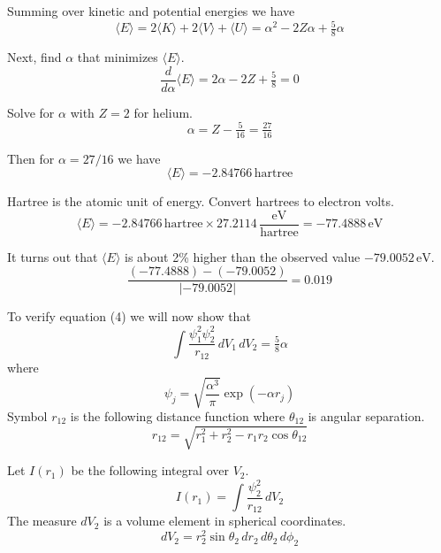 \documentclass[12pt]{article}
\begin{document}
\noindent
Summing over kinetic and potential energies we have
\begin{equation*}
\langle E\rangle=2\langle K\rangle+2\langle V\rangle+\langle U\rangle=\alpha^2-2Z\alpha+\tfrac{5}{8}\alpha
\end{equation*}

\noindent
Next, find $\alpha$ that minimizes $\langle E\rangle$.
\begin{equation*}
\frac{d}{d\alpha}\langle E\rangle=2\alpha-2Z+\tfrac{5}{8}=0
\end{equation*}

\noindent
Solve for $\alpha$ with $Z=2$ for helium.
\begin{equation*}
\alpha=Z-\tfrac{5}{16}=\tfrac{27}{16}
\end{equation*}

\noindent
Then for $\alpha=27/16$ we have
\begin{equation*}
\langle E\rangle=-2.84766\,\text{hartree}
\end{equation*}

\noindent
Hartree is the atomic unit of energy.
Convert hartrees to electron volts.
\begin{equation*}
\langle E\rangle=-2.84766\,\text{hartree}\times27.2114\,\frac{\text{eV}}{\text{hartree}}=-77.4888\,\text{eV}
\end{equation*}

\noindent
It turns out that $\langle E\rangle$ is about 2\% higher than the observed value $-79.0052\,\text{eV}$.
\begin{equation*}
\frac{(-77.4888)-(-79.0052)}{|-79.0052|}=0.019
\end{equation*}

\noindent
To verify equation (4) we will now show that
\begin{equation*}
\int\frac{\psi_1^2\psi_2^2}{r_{12}}\,dV_1\,dV_2=\tfrac{5}{8}\alpha
\end{equation*}
where
\begin{equation*}
\psi_j=\sqrt{\frac{\alpha^3}{\pi}}\exp\left(-\alpha r_j\right)
\end{equation*}
Symbol $r_{12}$ is the following distance function where $\theta_{12}$ is angular separation.
\begin{equation*}
r_{12}=\sqrt{r_1^2+r_2^2-r_1r_2\cos\theta_{12}}
\end{equation*}

\noindent
Let $I(r_1)$ be the following integral over $V_2$.
\begin{equation*}
I(r_1)=\int\frac{\psi_2^2}{r_{12}}\,dV_2
\end{equation*}
The measure $dV_2$ is a volume element in spherical coordinates.
\begin{equation*}
dV_2=r_2^2\sin\theta_2\,dr_2\,d\theta_2\,d\phi_2
\end{equation*}
\end{document}
